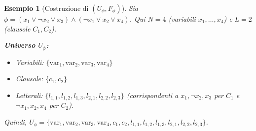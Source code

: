 \documentclass[a4paper]{article}
\newtheorem{example}{Esempio}
\begin{document}
\begin{example}[Costruzione di $(U_\phi, F_\phi)$]
Sia $\phi = (x_1 \lor \neg x_2 \lor x_3) \land (\neg x_1 \lor x_2 \lor x_4)$.
Qui $N=4$ (variabili $x_1, \ldots, x_4$) e $L=2$ (clausole $C_1, C_2$).

\textbf{Universo $U_\phi$:}
\begin{itemize}
    \item Variabili: $\{\text{var}_1, \text{var}_2, \text{var}_3, \text{var}_4\}$
    \item Clausole: $\{c_1, c_2\}$
    \item Letterali: $\{l_{1,1}, l_{1,2}, l_{1,3}, l_{2,1}, l_{2,2}, l_{2,3}\}$ (corrispondenti a $x_1, \neg x_2, x_3$ per $C_1$ e $\neg x_1, x_2, x_4$ per $C_2$).
\end{itemize}
Quindi, $U_\phi = \{\text{var}_1, \text{var}_2, \text{var}_3, \text{var}_4, c_1, c_2, l_{1,1}, l_{1,2}, l_{1,3}, l_{2,1}, l_{2,2}, l_{2,3}\}$.


\end{example}
\end{document}
